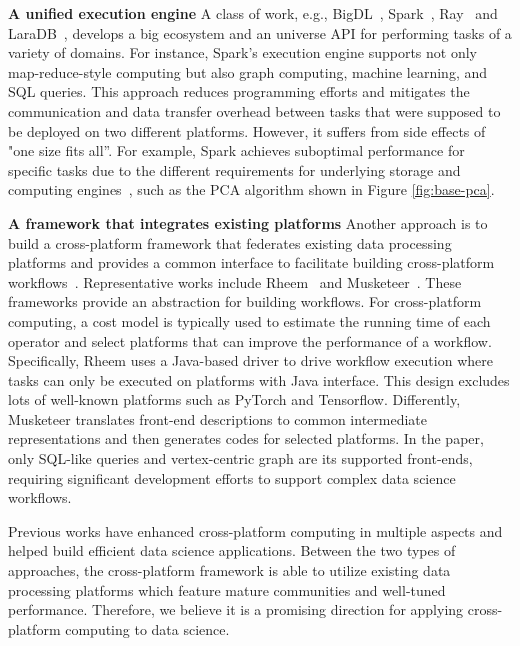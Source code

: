 \textbf{A unified execution engine} A class of work, e.g., BigDL~\cite{dai2019bigdl}, Spark~\cite{zaharia2016apache}, Ray~\cite{moritz2018ray} and LaraDB~\cite{kunft2019intermediate}, develops a big ecosystem and an universe API for performing tasks of a variety of domains. For instance, Spark’s execution engine supports not only map-reduce-style computing but also graph computing, machine learning, and SQL queries. This approach reduces programming efforts and mitigates the communication and data transfer overhead between tasks that were supposed to be deployed on two different platforms. However, it suffers from side effects of "one size fits all”. For example, Spark achieves suboptimal performance for specific tasks due to the different requirements for underlying storage and computing engines~\cite{anderson2017bridging, gittens2016matrix, gittens2018accelerating, dai2019bigdl}, such as the PCA algorithm shown in Figure \ref{fig:base-pca}. %

\textbf{A framework that integrates existing platforms}    Another approach is to build a cross-platform framework that federates existing data processing platforms and provides a common interface to facilitate building cross-platform workflows~\cite{gog2015musketeer, agrawal2016rheem, hausenblas2013apache, beam2017apache, wang2017myria, dziedzic2016data}. Representative works include Rheem~\cite{agrawal2016rheem} and Musketeer~\cite{gog2015musketeer}. 
These frameworks provide an abstraction for building workflows. For cross-platform computing, a cost model is typically used to estimate the running time of each operator and select platforms that can improve the performance of a workflow. 
Specifically, Rheem uses a Java-based driver to drive workflow execution where tasks can only be executed on platforms with Java interface. This design excludes lots of well-known platforms such as PyTorch and Tensorflow. Differently, Musketeer translates front-end descriptions to common intermediate representations and then generates codes for selected platforms. In the paper, only SQL-like queries and vertex-centric graph are its supported front-ends, requiring significant development efforts to support complex data science workflows.

Previous works have enhanced cross-platform computing in multiple aspects and helped build efficient data science applications. Between the two types of approaches, the cross-platform framework is able to utilize existing data processing platforms which feature mature communities and well-tuned performance. Therefore, we believe it is a promising direction for applying cross-platform computing to data science.


